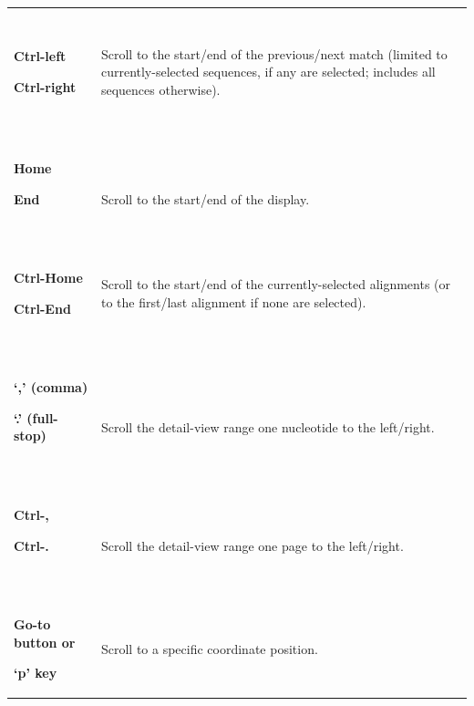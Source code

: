 \documentclass[letterpaper]{article}
\begin{document}
\begin{flushleft}
\begin{supertabular}{p{4.15cm}p{10.436cm}}
~
\\
{\bfseries Ctrl-left}

{\bfseries Ctrl-right}

~
 &
{ Scroll to the start/end of the previous/next
match (limited to currently-selected sequences, if any are selected;
includes all sequences otherwise).}

~
\\
{\bfseries Home}

{\bfseries End}

~
 &
 Scroll to the start/end of the display.\\
{\bfseries Ctrl-Home}

{\bfseries Ctrl-End}

~
 &
{ Scroll to the start/end of the
currently-selected alignments (or to the first/last alignment if none
are selected).}

~
\\
{\bfseries {\textquoteleft},{\textquoteright}
(comma)}

{\bfseries {\textquoteleft}.{\textquoteright}
(full-stop)}

~
 &
 Scroll the detail-view range one nucleotide to
the left/right.\\
{\bfseries Ctrl-,}

{\bfseries Ctrl-.}

~
 &
 Scroll the detail-view range one page to the
left/right.\\
{\bfseries Go-to button or}

\bfseries {\textquoteleft}p{\textquoteright} key
&
 Scroll to a specific coordinate position.\\
\end{supertabular}
\end{flushleft}
\end{document}

